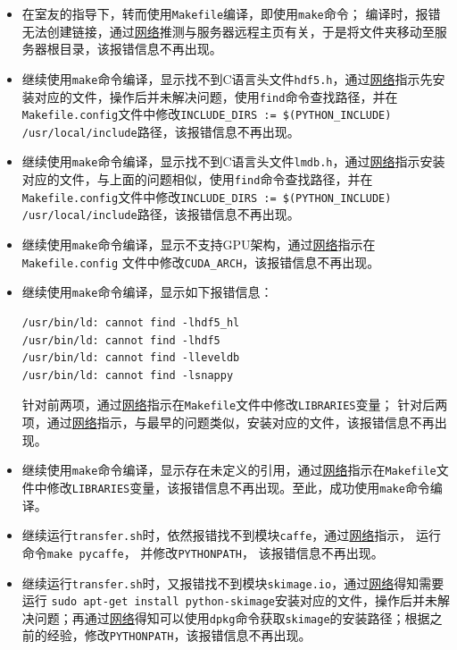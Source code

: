 \documentclass[12pt]{article}
\begin{document}
\begin{itemize}
\item 在室友的指导下，转而使用\verb|Makefile|编译，即使用\verb|make|命令；
编译时，报错无法创建链接，通过\href{https://blog.csdn.net/guozhongwei1/article/details/82834848}{网络}推测与服务器远程主页有关，于是将文件夹移动至服务器根目录，该报错信息不再出现。
\item 继续使用\verb|make|命令编译，显示找不到C语言头文件\verb|hdf5.h|，通过\href{https://blog.csdn.net/uuuuur/article/details/109367417}{网络}指示先安装对应的文件，操作后并未解决问题，使用\verb|find|命令查找路径，并在\verb|Makefile.config|文件中修改\verb|INCLUDE_DIRS := $(PYTHON_INCLUDE) /usr/local/include|路径，该报错信息不再出现。
\item 
继续使用\verb|make|命令编译，显示找不到C语言头文件\verb|lmdb.h|，通过\href{https://blog.csdn.net/sdlypyzq/article/details/85236736}{网络}指示安装对应的文件，与上面的问题相似，使用\verb|find|命令查找路径，并在\verb|Makefile.config|文件中修改\verb|INCLUDE_DIRS := $(PYTHON_INCLUDE) /usr/local/include|路径，该报错信息不再出现。
\item 继续使用\verb|make|命令编译，显示不支持GPU架构，通过\href{https://www.jianshu.com/p/cc7a405322e3}{网络}指示在\verb|Makefile.config| 文件中修改\verb|CUDA_ARCH|，该报错信息不再出现。
\item 继续使用\verb|make|命令编译，显示如下报错信息：
\begin{lstlisting}
/usr/bin/ld: cannot find -lhdf5_hl
/usr/bin/ld: cannot find -lhdf5
/usr/bin/ld: cannot find -lleveldb
/usr/bin/ld: cannot find -lsnappy
\end{lstlisting}
针对前两项，通过\href{https://796t.com/content/1548083182.html}{网络}指示在\verb|Makefile|文件中修改\verb|LIBRARIES|变量；
针对后两项，通过\href{https://www.cnblogs.com/z-books/p/4171195.html}{网络}指示，与最早的问题类似，安装对应的文件，该报错信息不再出现。
\item 继续使用\verb|make|命令编译，显示存在未定义的引用，通过\href{https://blog.csdn.net/weixin_41770169/article/details/90413895}{网络}指示在\verb|Makefile|文件中修改\verb|LIBRARIES|变量，该报错信息不再出现。至此，成功使用\verb|make|命令编译。
\item 继续运行\verb|transfer.sh|时，依然报错找不到模块\verb|caffe|，通过\href{https://blog.csdn.net/cui841923894/article/details/81639290}{网络}指示，
运行命令\verb|make pycaffe|，
并修改\verb|PYTHONPATH|，
该报错信息不再出现。
\item 继续运行\verb|transfer.sh|时，又报错找不到模块\verb|skimage.io|，通过\href{https://blog.csdn.net/u010205128/article/details/80995358}{网络}得知需要运行 \verb|sudo apt-get install python-skimage|安装对应的文件，操作后并未解决问题；再通过\href{https://www.cnblogs.com/zhuiluoyu/p/5181098.html}{网络}得知可以使用\verb|dpkg|命令获取\verb|skimage|的安装路径；根据之前的经验，修改\verb|PYTHONPATH|，该报错信息不再出现。
\end{itemize}
\end{document}
